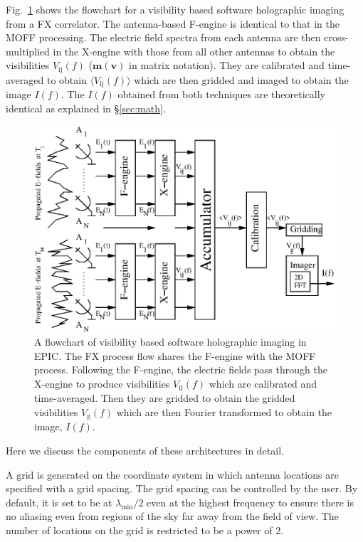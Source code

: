 \documentclass[a4paper,fleqn,usenatbib]{mnras}
\begin{document}
Fig.~\ref{fig:FX-flowchart} shows the flowchart for a visibility based software 
holographic imaging from a FX correlator. The antenna-based F-engine is identical 
to that in the MOFF processing. The electric field spectra from each antenna are 
then cross-multiplied in the X-engine with those from all other antennas to 
obtain the visibilities $V_\textrm{ij}(f)$ ($\mathbf{m}(\mathbf{v})$ in matrix 
notation). They are calibrated and time-averaged to obtain 
$\langle V_\textrm{ij}(f)\rangle$ which are then gridded and imaged to obtain the 
image $I(f)$. The $I(f)$ obtained from both techniques are theoretically 
identical as explained in \S\ref{sec:math}.
\begin{figure}
  \includegraphics[width=\columnwidth]{FX_flowchart}
  \caption{A flowchart of visibility based software holographic imaging in EPIC. 
    The FX process flow shares the F-engine with the MOFF process. Following the 
    F-engine, the electric fields pass through the X-engine to produce 
    visibilities $V_\textrm{ij}(f)$ which are calibrated and time-averaged. Then 
    they are gridded to obtain the gridded visibilities $V_\textrm{g}(f)$ which 
    are then Fourier transformed to obtain the image, $I(f)$.}
  \label{fig:FX-flowchart}
\end{figure}

Here we discuss the components of these architectures in detail. 

\par\medskip
{}
\par\medskip
\noindent A grid is generated on the coordinate system in which antenna 
locations are specified with a grid spacing. The grid spacing can be controlled 
by the user. By default, it is set to be at $\lambda_\textrm{min}/2$ even at the 
highest frequency to ensure there is no aliasing even from regions of the sky 
far away from the field of view. The number of locations on the grid is 
restricted to be a power of 2. 
\end{document}

